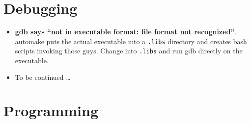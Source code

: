 \section{Debugging}
\begin{itemize}
  \item \textbf{gdb says ``not in executable format: file format not
  recognized''}. automake puts the actual executable into a \texttt{.libs}
  directory and creates bash scripts invoking those guys. Change into
  \texttt{.libs} and run gdb directly on the executable.
  \item To be continued \dots
\end{itemize}




\section{Programming}

